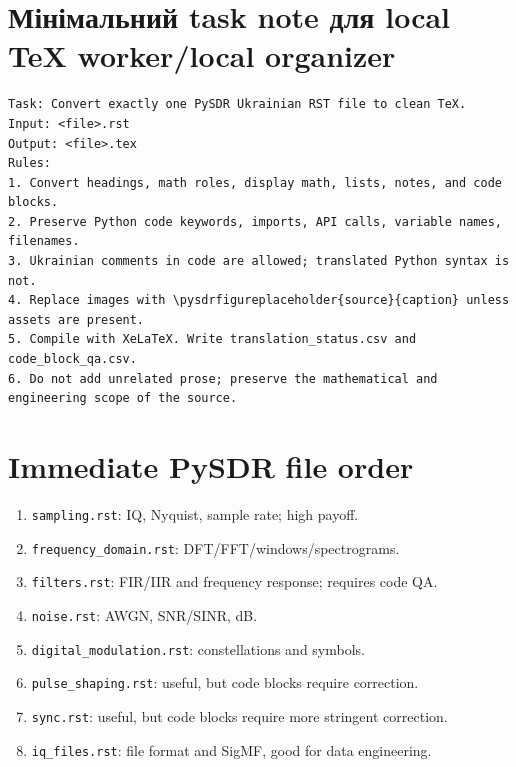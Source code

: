 \section{Мінімальний task note для local TeX worker/local organizer}
\begin{lstlisting}[language={}]
Task: Convert exactly one PySDR Ukrainian RST file to clean TeX.
Input: <file>.rst
Output: <file>.tex
Rules:
1. Convert headings, math roles, display math, lists, notes, and code blocks.
2. Preserve Python code keywords, imports, API calls, variable names, filenames.
3. Ukrainian comments in code are allowed; translated Python syntax is not.
4. Replace images with \pysdrfigureplaceholder{source}{caption} unless assets are present.
5. Compile with XeLaTeX. Write translation_status.csv and code_block_qa.csv.
6. Do not add unrelated prose; preserve the mathematical and engineering scope of the source.
\end{lstlisting}

\section{Immediate PySDR file order}
\begin{enumerate}
\item \texttt{sampling.rst}: IQ, Nyquist, sample rate; high payoff.
\item \texttt{frequency\_domain.rst}: DFT/FFT/windows/spectrograms.
\item \texttt{filters.rst}: FIR/IIR and frequency response; requires code QA.
\item \texttt{noise.rst}: AWGN, SNR/SINR, dB.
\item \texttt{digital\_modulation.rst}: constellations and symbols.
\item \texttt{pulse\_shaping.rst}: useful, but code blocks require correction.
\item \texttt{sync.rst}: useful, but code blocks require more stringent correction.
\item \texttt{iq\_files.rst}: file format and SigMF, good for data engineering.
\end{enumerate}

